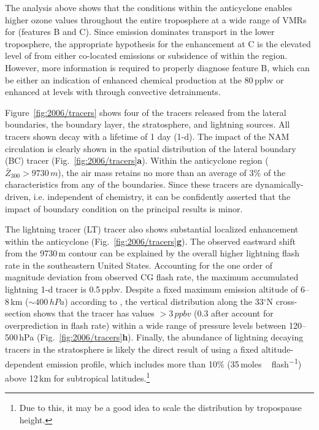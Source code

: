 The analysis above shows that the conditions within the anticyclone enables higher ozone values throughout the entire troposphere at
a wide range of VMRs for  (features B and C). Since emission dominates transport in the lower
troposphere, the appropriate hypothesis for the enhancement at C is the elevated level of  from either co-located
emissions or subsidence of {\lnox} within the region. However, more information is required to properly diagnose feature B, which
can be either an indication of enhanced  chemical production at the 80\,\unit{ppbv}  or enhanced 
at levels with  through convective detrainments.


Figure~\ref{fig:2006/tracers} shows four of the tracers released from the lateral boundaries, the boundary layer, the stratosphere, and
lightning sources. All tracers shown decay with a lifetime of 1 day (1-d). The impact of the NAM circulation is clearly shown
in the spatial distribution of the lateral boundary (BC) tracer (Fig.~\ref{fig:2006/tracers}{\bf a}). Within the anticyclone region ($\bar{Z}_{300}
>9730\,\unit{m}$), the air mass retains no more than an average of 3\% of the characteristics from any of the boundaries. Since these
tracers are dynamically-driven, i.e. independent of chemistry, it can be confidently asserted that the impact of boundary condition on the principal results is minor.

The lightning  tracer (LT) tracer also shows substantial localized enhancement within the anticyclone (Fig.~\ref{fig:2006/tracers}{\bf g}).
The observed eastward shift from the 9730\,\unit{m} contour can be explained by the overall higher lightning flash rate in the southeastern 
United States. Accounting for the one order of magnitude deviation from observed CG flash rate, the maximum accumulated lightning
1-d tracer is 0.5\,\unit{ppbv}. Despite a fixed maximum emission altitude of 6--8\,\unit{km} ($\sim400\,\unit{hPa}$) according to
\citet{Ott:2010lo}, the vertical distribution along the 33$^\circ$N cross-section shows that the tracer has values $>3\,\unit{ppbv}$ (0.3
after account for overprediction in flash rate) within a wide range of pressure levels between 120--500\,\unit{hPa}
(Fig.~\ref{fig:2006/tracers}{\bf h}). Finally, the abundance of lightning decaying tracers in the stratosphere is likely the direct result of using a
fixed altitude-dependent emission profile, which includes more than 10\% (35\,\unit{moles\,flash^{-1}}) above 12\,\unit{km} for
subtropical latitudes.\footnote{Due to this, it may be a good idea to scale the \citet{Ott:2010lo} distribution by tropospause height.}

